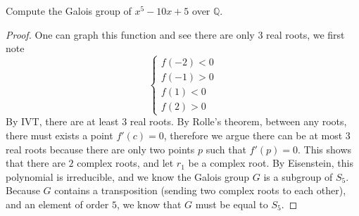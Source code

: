\documentclass[openany]{book}
\newcommand{\Q}{\mathbb{Q}}
\begin{document}
\begin{prob}
    Compute the Galois group of \(x^{5}-10x+5\) over \(\mathbb{Q}\).
\end{prob}
\begin{proof}
    One can graph this function and see there are only $3$ real roots, we first note 
    \begin{equation*}
        \begin{cases}
            f(-2)<0\\
            f(-1)>0\\
            f(1)<0\\
            f(2)>0
        \end{cases}
    \end{equation*}
    By IVT, there are at least $3$ real roots. By Rolle's theorem, between any roots, there must exists a point $f'(c)=0$, therefore we argue there can be at most 3 real roots because there are only two points $p$ such that $f'(p)=0$. This shows that there are $2$ complex roots, and let $r_1$ be a complex root. By Eisenstein, this polynomial is irreducible, and we know the Galois group $G$ is a subgroup of $S_5$. Because $G$ contains a transposition (sending two complex roots to each other), and an element of order $5$, we know that $G$ must be equal to $S_5$.

\end{proof}
\end{document}
